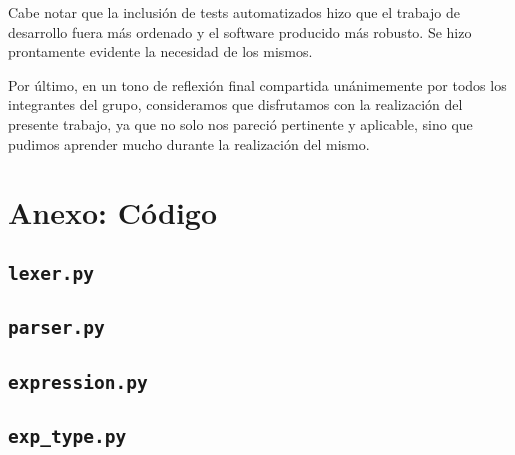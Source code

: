 \documentclass[11pt]{article}
\begin{document}
Cabe notar que la inclusión de tests automatizados hizo que el trabajo de desarrollo fuera más ordenado y el software producido más robusto. Se hizo prontamente evidente la necesidad de los mismos.

Por último, en un tono de reflexión final compartida unánimemente por todos los integrantes del grupo, consideramos que disfrutamos con la realización del presente trabajo, ya que no solo nos pareció pertinente y aplicable, sino que pudimos aprender mucho durante la realización del mismo.


\printbibliography


\newpage
\appendix
\section*{Anexo: Código}

\subsection*{\texttt{lexer.py}}
\small


\subsection*{\texttt{parser.py}}
\small


\subsection*{\texttt{expression.py}}
\small


\subsection*{\texttt{exp\_type.py}}
\small


\end{document}
